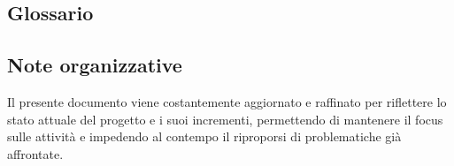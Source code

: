 \subsection{Glossario} 
\GlossarioIntroduzione

\subsection{Note organizzative}
Il presente documento viene costantemente aggiornato e raffinato per riflettere lo stato attuale del progetto e i suoi incrementi, permettendo di mantenere il focus sulle attività e impedendo al contempo il riproporsi di problematiche già affrontate.
